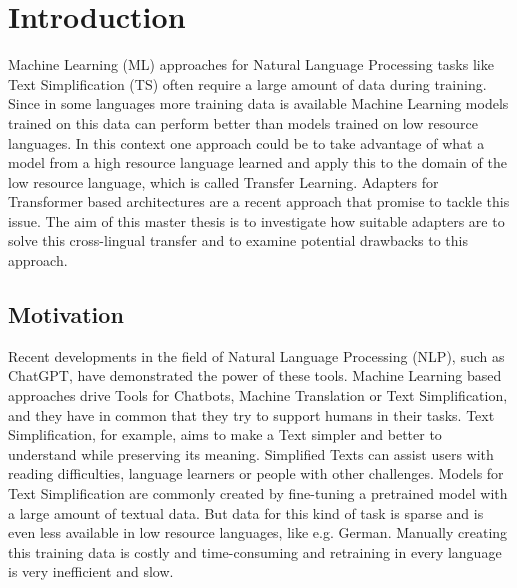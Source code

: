 \section{Introduction}
Machine Learning (ML) approaches for Natural Language Processing tasks like
Text Simplification (TS) often require a large amount of data during training.
Since in some languages more training data is available Machine Learning models
trained on this data can perform better than models trained on low resource languages.
In this context one approach could be to take advantage of what a model from a high resource
language learned and apply this to the domain of the low resource language, which is
called Transfer Learning.
Adapters for Transformer based architectures are a recent approach that promise to tackle this issue.
The aim of this master thesis is to investigate how suitable adapters are to solve this cross-lingual transfer
and to examine potential drawbacks to this approach. 

\subsection{Motivation}
Recent developments in the field of Natural Language Processing (NLP), such as ChatGPT, have demonstrated the power of
these tools. Machine Learning based approaches drive Tools for Chatbots, Machine Translation or Text Simplification, and 
they have in common that they try to support humans in their tasks.
Text Simplification, for example, aims to make a Text simpler and better to understand while preserving its meaning.
Simplified Texts can assist users with reading difficulties, language learners or people with other challenges.
Models for Text Simplification are commonly created by fine-tuning a pretrained model with a large amount of textual data.
But data for this kind of task is sparse and is even less available in low resource languages, like e.g. German.
Manually creating this training data is costly and time-consuming and retraining in every language is very inefficient and slow.

